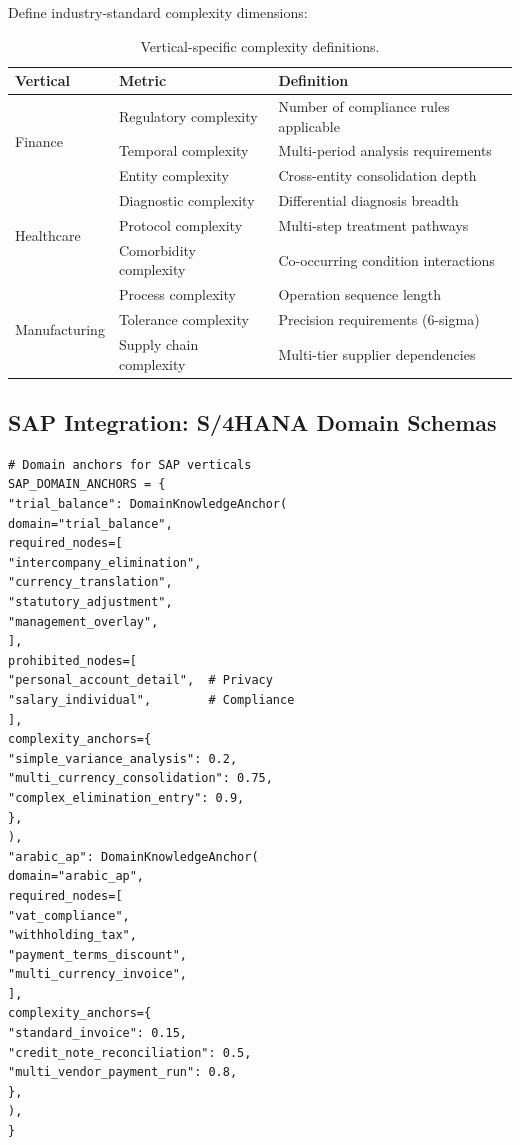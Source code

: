 \documentclass[12pt,a4paper,twoside]{report}
\begin{document}
Define industry-standard complexity dimensions:

\begin{table}[htbp]
\centering
\caption{Vertical-specific complexity definitions.}
\label{tab:vertical-complexity}
\footnotesize
\begin{tabularx}{\textwidth}{@{}l l X@{}}
\toprule
\textbf{Vertical} & \textbf{Metric} & \textbf{Definition} \\
\midrule
\multirow{3}{*}{Finance}
& Regulatory complexity & Number of compliance rules applicable \\
& Temporal complexity & Multi-period analysis requirements \\
& Entity complexity & Cross-entity consolidation depth \\
\midrule
\multirow{3}{*}{Healthcare}
& Diagnostic complexity & Differential diagnosis breadth \\
& Protocol complexity & Multi-step treatment pathways \\
& Comorbidity complexity & Co-occurring condition interactions \\
\midrule
\multirow{3}{*}{Manufacturing}
& Process complexity & Operation sequence length \\
& Tolerance complexity & Precision requirements (6-sigma) \\
& Supply chain complexity & Multi-tier supplier dependencies \\
\bottomrule
\end{tabularx}
\end{table}

\subsection{SAP Integration: S/4HANA Domain Schemas}

\begin{lstlisting}[language=jsonx,caption={SAP S/4HANA domain calibration.}]
# Domain anchors for SAP verticals
SAP_DOMAIN_ANCHORS = {
"trial_balance": DomainKnowledgeAnchor(
domain="trial_balance",
required_nodes=[
"intercompany_elimination",
"currency_translation",
"statutory_adjustment",
"management_overlay",
],
prohibited_nodes=[
"personal_account_detail",  # Privacy
"salary_individual",        # Compliance
],
complexity_anchors={
"simple_variance_analysis": 0.2,
"multi_currency_consolidation": 0.75,
"complex_elimination_entry": 0.9,
},
),
"arabic_ap": DomainKnowledgeAnchor(
domain="arabic_ap",
required_nodes=[
"vat_compliance",
"withholding_tax",
"payment_terms_discount",
"multi_currency_invoice",
],
complexity_anchors={
"standard_invoice": 0.15,
"credit_note_reconciliation": 0.5,
"multi_vendor_payment_run": 0.8,
},
),
}
\end{lstlisting}
\end{document}
